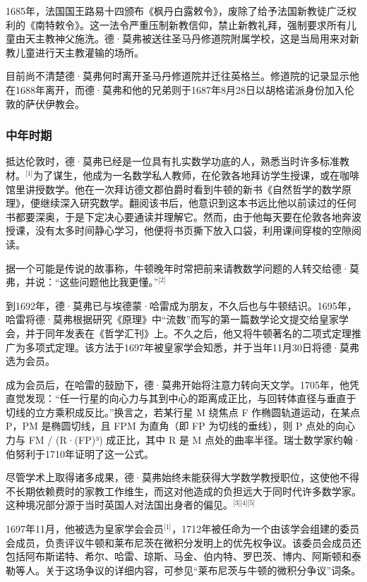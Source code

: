 1685年，法国国王路易十四颁布《枫丹白露敕令》，废除了给予法国新教徒广泛权利的《南特敕令》。这一法令严重压制新教信仰，禁止新教礼拜，强制要求所有儿童由天主教神父施洗。德·莫弗被送往圣马丹修道院附属学校，这是当局用来对新教儿童进行天主教灌输的场所。

目前尚不清楚德·莫弗何时离开圣马丹修道院并迁往英格兰。修道院的记录显示他在1688年离开，而德·莫弗和他的兄弟则于1687年8月28日以胡格诺派身份加入伦敦的萨伏伊教会。
\subsubsection{中年时期}
抵达伦敦时，德·莫弗已经是一位具有扎实数学功底的人，熟悉当时许多标准教材。\(^\text{[1]}\)为了谋生，他成为一名数学私人教师，在伦敦各地拜访学生授课，或在咖啡馆里讲授数学。他在一次拜访德文郡伯爵时看到牛顿的新书《自然哲学的数学原理》，便继续深入研究数学。翻阅该书后，他意识到这本书远比他以前读过的任何书都要深奥，于是下定决心要通读并理解它。然而，由于他每天要在伦敦各地奔波授课，没有太多时间静心学习，他便将书页撕下放入口袋，利用课间穿梭的空隙阅读。

据一个可能是传说的故事称，牛顿晚年时常把前来请教数学问题的人转交给德·莫弗，并说：“这些问题他比我更懂。”\(^\text{[2]}\)

到1692年，德·莫弗已与埃德蒙·哈雷成为朋友，不久后也与牛顿结识。1695年，哈雷将德·莫弗根据研究《原理》中“流数”而写的第一篇数学论文提交给皇家学会，并于同年发表在《哲学汇刊》上。不久之后，他又将牛顿著名的二项式定理推广为多项式定理。该方法于1697年被皇家学会知悉，并于当年11月30日将德·莫弗选为会员。

成为会员后，在哈雷的鼓励下，德·莫弗开始将注意力转向天文学。1705年，他凭直觉发现：“任一行星的向心力与其到中心的距离成正比，与回转体直径与垂直于切线的立方乘积成反比。”换言之，若某行星 M 绕焦点 F 作椭圆轨道运动，在某点 P，PM 是椭圆切线，且 FPM 为直角（即 FP 为切线的垂线），则 P 点处的向心力与 FM / (R·(FP)³) 成正比，其中 R 是 M 点处的曲率半径。瑞士数学家约翰·伯努利于1710年证明了这一公式。

尽管学术上取得诸多成果，德·莫弗始终未能获得大学数学教授职位，这使他不得不长期依赖费时的家教工作维生，而这对他造成的负担远大于同时代许多数学家。这种境况部分源于当时英国人对法国出身者的偏见。\(^\text{[3][4][5]}\)

1697年11月，他被选为皇家学会会员\(^\text{[1]}\)，1712年被任命为一个由该学会组建的委员会成员，负责评议牛顿和莱布尼茨在微积分发明上的优先权争议。该委员会成员还包括阿布斯诺特、希尔、哈雷、琼斯、马金、伯内特、罗巴茨、博内、阿斯顿和泰勒等人。关于这场争议的详细内容，可参见“莱布尼茨与牛顿的微积分争议”词条。

